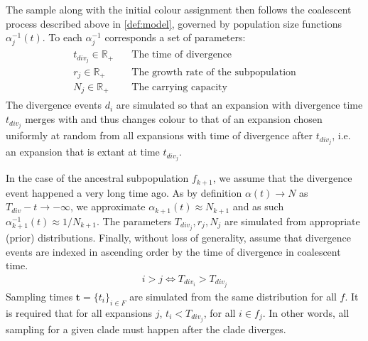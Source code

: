 \documentclass{report}
\newcommand{\R}{\mathbb{R}}
\theoremstyle{definition}
\begin{document}
The sample along with the initial colour assignment then follows the coalescent process described above in \ref{def:model}, governed by population size functions $\alpha^{-1}_{j}(t)$. To each $\alpha^{-1}_{j}$ corresponds a set of parameters:
\begin{gather}
\begin{aligned}
t_{div_{j}}\in\R_+ \quad&\text{The time of divergence}\\
r_j\in\R_+\quad&\text{The growth rate of the subpopulation}\\
N_j\in\R_+\quad&\text{The carrying capacity}
\end{aligned}
\end{gather}
The divergence events $d_i$ are simulated so that an expansion with divergence time $t_{div_j}$ merges with and thus changes colour to that of an expansion chosen uniformly at random from all expansions with time of divergence after $t_{div_j}$, i.e. an expansion that is extant at time $t_{div_j}$.

In the case of the ancestral subpopulation $f_{k+1}$, we assume that the divergence event happened a very long time ago. As by definition $\alpha(t) \rightarrow N$ as $T_{div}-t\rightarrow -\infty$, we approximate $\alpha_{k+1}(t) \approx N_{k+1}$ and as such $\alpha^{-1}_{k+1}(t) \approx 1/N_{k+1}$. The parameters $T_{div_{j}}, r_j, N_j$ are simulated from appropriate (prior) distributions.
Finally, without loss of generality, assume that divergence events are indexed in ascending order by the time of divergence in coalescent time.
\begin{gather}
i > j \Leftrightarrow T_{div_i} > T_{div_j}  
\end{gather}
Sampling times $\mathbf{t}=\{t_i\}_{i\in F}$ are simulated from the same distribution for all $f$. It is required that for all expansions $j$, $t_i < T_{div_j}$, for all $i \in f_j$. In other words, all sampling for a given clade must happen after the clade diverges.
\end{document}

